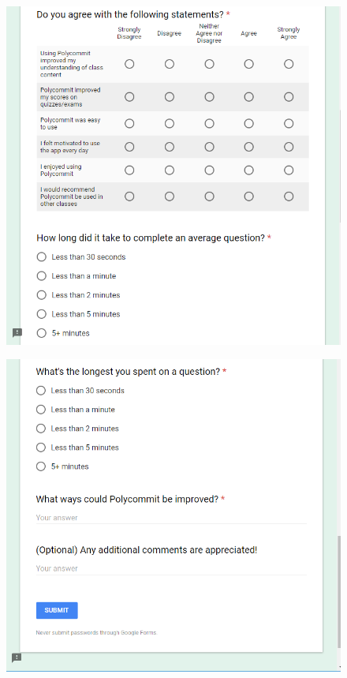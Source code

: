 \begin{figure}[h!]
	\includegraphics[width=1.0\linewidth]{figures/survey2}
	\label{fig:survey2}
\end{figure}

\begin{figure}[h!]
	\includegraphics[width=1.0\linewidth]{figures/survey3}
	\label{fig:survey3}
\end{figure}
